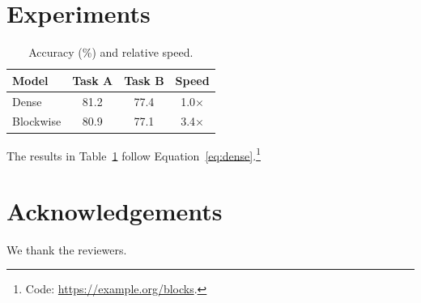 \documentclass[11pt]{article}
\begin{document}
\section{Experiments}
\begin{table}[h]
\centering
\caption{Accuracy (\%) and relative speed.}
\label{tab:main}
\begin{tabular}{lccc}
\toprule
Model & Task A & Task B & Speed \\
\midrule
Dense & 81.2 & 77.4 & 1.0$\times$ \\
Blockwise & 80.9 & 77.1 & 3.4$\times$ \\
\bottomrule
\end{tabular}
\end{table}
The results in Table~\ref{tab:main} follow Equation~\eqref{eq:dense}.\footnote{Code: \url{https://example.org/blocks}.}
\section*{Acknowledgements}
We thank the reviewers.
\end{document}
